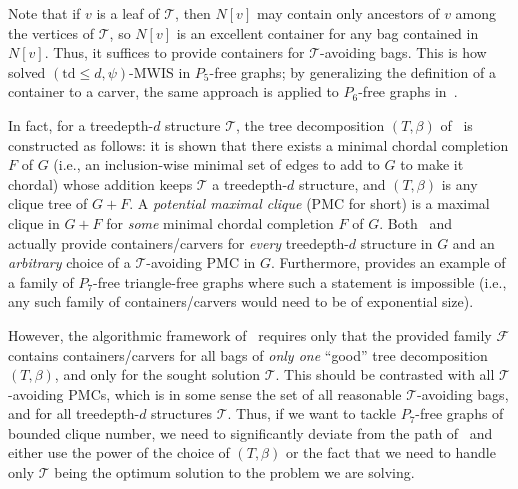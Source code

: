 \documentclass[11pt,a4paper]{article}
\theoremstyle{definition}
\def\T{\mathcal{T}}
\begin{document}
Note that if $v$ is a leaf of $\T$, then $N[v]$ may contain only ancestors of $v$ among the vertices of $\T$, so $N[v]$ is an excellent container
for any bag contained in $N[v]$. Thus, it suffices to provide containers for $\T$-avoiding bags. 
This is how~\cite{Tara} solved $(\mathrm{td} \leq d,\psi)$-\textsc{MWIS} in $P_5$-free graphs; by generalizing the definition of a container
to a carver, the same approach is applied to $P_6$-free graphs in~\cite{DBLP:conf/soda/ChudnovskyMPPR24}.

In fact, for a treedepth-$d$ structure $\T$, the tree decomposition $(T,\beta)$ of~\cite{FominTV15} is constructed as follows: 
it is shown that there exists a minimal chordal completion $F$ of $G$ (i.e., an inclusion-wise minimal set of edges to add to $G$ to make it chordal)
whose addition keeps $\T$ a treedepth-$d$ structure, and $(T,\beta)$ is any clique tree of $G+F$. 
A \emph{potential maximal clique} (PMC for short) is a maximal clique in $G+F$ for \emph{some} minimal chordal completion $F$ of $G$.
Both~\cite{Tara} and~\cite{DBLP:conf/soda/ChudnovskyMPPR24} actually provide containers/carvers for \emph{every} treedepth-$d$ structure in $G$ and 
an \emph{arbitrary} choice of a $\T$-avoiding PMC in $G$. 
Furthermore, \cite{DBLP:conf/soda/ChudnovskyMPPR24} provides an example of a family of $P_7$-free triangle-free graphs where such a statement is impossible
(i.e., any such family of containers/carvers would need to be of exponential size). 

However, the algorithmic framework of~\cite{FominTV15,Tara,DBLP:conf/soda/ChudnovskyMPPR24} requires only that the provided family $\mathcal{F}$ contains containers/carvers
for all bags of \emph{only one} ``good'' tree decomposition $(T,\beta)$,
and only for the sought solution $\T$.
This should be contrasted with all $\T$-avoiding PMCs, which is in some sense
the set of all reasonable $\T$-avoiding bags, and for all treedepth-$d$ structures $\T$. Thus, if we want to tackle $P_7$-free graphs of bounded clique number, we need
to significantly deviate from the path of~\cite{Tara,DBLP:conf/soda/ChudnovskyMPPR24} and either use the power of the choice of $(T,\beta)$ or the fact that we need to handle only $\T$ being
the optimum solution to the problem we are solving. 
\end{document}
